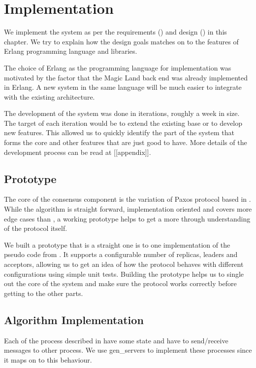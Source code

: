 \chapter{Implementation}
\label{chapter:implementation}

We implement the system as per the requirements () and
design () in this chapter. We try to explain how the
design goals matches on to the features of Erlang \citep{erlang} programming
language and  libraries.

The choice of Erlang as the programming language for implementation was
motivated by the factor that the Magic Land back end was already implemented in
Erlang. A new system in the same language will be much easier to integrate with
the existing architecture.

The development of the system was done in iterations, roughly a week in size.
The target of each iteration would be to extend the existing base or to develop
new features. This allowed us to quickly identify the part of the system that
forms the core and other features that are just good to have. More details of
the development process can be read at [[appendix]].

\section{Prototype}

The core of the consensus component is the variation of Paxos protocol based
in \citet{Robbert2011}. While the algorithm is straight forward, implementation
oriented and covers more edge cases than \citet{Lamport01}, a working prototype
helps to get a more through understanding of the protocol itself.

We built a prototype that is a straight one is to one implementation of the
pseudo code from \citet{Robbert2011}. It supports a configurable number of
replicas, leaders and acceptors, allowing us to get an idea of how the protocol
behaves with different configurations using simple unit tests. Building the
prototype helps us to single out the core of the system and make sure the
protocol works correctly before getting to the other parts.

\section{Algorithm Implementation}

Each of the process described in  have some state
and have to send/receive messages to other process. We use gen\_servers
 to implement these processes since it maps on to
this behaviour.

